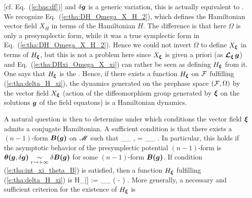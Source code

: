 [cf. Eq.~(\ref{e:bas:df})] and $\delta\bm{g}$ is a generic variation, this is
actually equivalent to
\be \label{e:tha:DHxi_Omega_X_xi}
     .
\ee
We recognize Eq.~(\ref{e:tha:DH_Omega_X_H_2}), which defines the Hamiltonian
vector field $X_H$ in terms of the Hamiltonian $H$. The difference is that here $\Omega$
is only a presymplectic form, while it was a true symplectic form
in Eq.~(\ref{e:tha:DH_Omega_X_H_2}).
Hence we could not invert $\Omega$ to define $X_{\bm{\xi}}$ in terms of $H_{\bm{\xi}}$,
but this is not a problem here since $X_{\bm{\xi}}$ is given a priori (as
$\bm{\mathcal{L}}_{\bm{\xi}}\, \bm{g}$) and Eq.~(\ref{e:tha:DHxi_Omega_X_xi}) can rather be seen
as defining $H_{\bm{\xi}}$ from it.
One says that $H_{\bm{\xi}}$ is the
\cite{WaldZ00}. Hence, if there exists a function $H_{\bm{\xi}}$ on $\mathcal{F}$
fulfilling (\ref{e:tha:delta_H_xi}),
the dynamics generated on the prephase space $(\mathcal{F},\Omega)$ by the vector field
$X_{\bm{\xi}}$ (action of the diffeomorphism group generated by $\bm{\xi}$ on the solutions
$\bm{g}$ of the field equatons) is a Hamiltonian dynamics.

A natural question is then to determine under which conditions the vector field
$\bm{\xi}$ admits a conjugate Hamiltonian. A sufficient condition
is that there exists a $(n-1)$-form $\bm{B}\textbf{(}\bm{g}\textbf{)}$ on $\mathscr{M}$
such that
\be \label{e:tha:int_xi_theta_B}
     \int_{\Sp_\infty} \!\! \w{\xi}\cdot\w{\theta}\lld{},\delta{}\rld
     = \delta \int_{\Sp_\infty} \!\! \w{\xi}\cdot{}\lld{}\rld .
\ee
In particular, this holds if the
asymptotic behavior of
the presymplectic potential $(n-1)$-form is
$\bm{\theta}\textbf{(}\bm{g},\delta\bm{g}\textbf{)}
    \underset{r\to +\infty}{\sim} \delta \bm{B}\textbf{(}\bm{g}\textbf{)}$
for some $(n-1)$-form $\bm{B}\textbf{(}\bm{g}\textbf{)}$.
If condition (\ref{e:tha:int_xi_theta_B}) is satisfied, then
a function $H_{\bm{\xi}}$ fulfilling (\ref{e:tha:delta_H_xi}) is
\be \label{e:tha:Hxi_Q_B}
    H_{\w{\xi}}[] := \int_{\Sp_\infty}\!\! \left( \lld\w{\xi}\rld
    - \w{\xi}\cdot  {}\lld{}\rld  \right) .
\ee
More generally, a necessary and sufficient criterion for the existence of
$H_{\bm{\xi}}$ is

